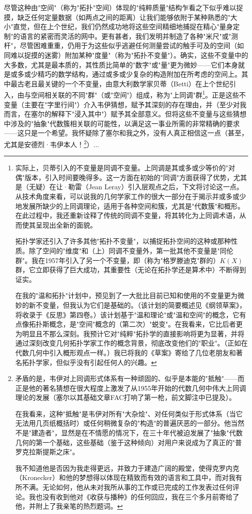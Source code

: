 尽管这种由"空间"（称为"拓扑"空间）体现的"纯粹质量"结构乍看之下似乎难以捉摸，缺乏任何定量数据（如两点之间的距离）让我们能够依附于某种熟悉的"大小"直觉，但在上个世纪，我们仍然成功地将这些空间精细地捕捉在精心"量身定制"的语言的紧密而灵活的网中。更有甚者，我们发明并制造了各种"米尺"或"测杆"，尽管困难重重，仍用于为这些似乎逃避任何测量尝试的触手可及的空间（如同难以捉摸的迷雾）附加某种"度量"（称为"拓扑不变量"）。确实，这些不变量中的大多数，尤其是最本质的，其性质比简单的"数字"或"量"更为微妙——它们本身就是或多或少精巧的数学结构，通过或多或少复杂的构造附加在所考虑的空间上。其中最古老且最关键的一个不变量，由意大利数学家贝蒂（Betti）在上个世纪引入，由与空间相关联的不同"群"（或"空间"）组成，称为"上同调"群\footnote{实际上，贝蒂引入的不变量是同调不变量。上同调是其或多或少等价的"对偶"版本，引入时间要晚得多。这一方面在初始的"同调"方面获得了优势，尤其是（无疑）在让·勒雷（Jean Leray）引入层观点之后，下文将讨论这一点。从技术角度来看，可以说我的几何学家工作的很大一部分在于揭示并或多或少地发展所缺少的上同调理论，适用于各种空间和簇，尤其是"代数簇"和概形。在此过程中，我还重新诠释了传统的同调不变量，将其转化为上同调术语，从而使其呈现出全新的面貌。

拓扑学家还引入了许多其他"拓扑不变量"，以捕捉拓扑空间的这种或那种性质。除了空间的"维度"和（上）同调不变量外，第一批其他不变量是"同伦群"。我在1957年引入了另一个不变量，即（称为"格罗滕迪克"群的）$K(X)$群，它立即获得了巨大成功，其重要性（无论在拓扑学还是算术中）不断得到证实。

在我的"温和拓扑"计划中，预见到了一大批比目前已知和使用的不变量更为微妙的新不变量，但我认为它们是基础的。（该计划的简要概述见《纲领草案》，将收录于《反思》第四卷。）该计划基于"温和理论"或"温和空间"的概念，它有点像拓扑斯概念，是"空间"概念的（第二次）"蜕变"。在我看来，它比后者更为明显且不那么深刻。我预计它对"纯粹"拓扑学的直接影响将更为显著，并将通过深刻改变几何拓扑学家工作的概念背景，彻底改变他们的"职业"。（正如在代数几何中引入概形观点一样。）我已将我的《草案》寄给了几位老朋友和著名拓扑学家，但似乎没有引起任何人的兴趣。}。正是这些不变量（主要在"字里行间"）介入韦伊猜想，赋予其深刻的存在理由，并（至少对我而言，在塞尔的解释下"浸入其中"）赋予其全部意义。但将这些不变量与这些猜想中涉及的"抽象"代数簇相关联的可能性，以满足这一事业所需的非常精确的要求——这只是一个希望。我怀疑除了塞尔和我之外，没有人真正相信这一点（甚至，尤其是安德烈·韦伊本人！\footnote{矛盾的是，韦伊对上同调形式体系有一种顽固的、似乎是本能的"抵触"——而正是他的著名猜想在很大程度上激发了从1955年开始的代数几何中伟大上同调理论的发展（塞尔以其基础文章FAC打响了第一枪，前文脚注中已提及）。

在我看来，这种"抵触"是韦伊对所有"大杂烩"、对任何类似于形式体系（当它无法用几页纸概括时）或任何稍微复杂的"构造"的普遍厌恶的一部分。他当然不是"建造者"，显然是在不情愿的情况下，在三十年代被迫发展了"抽象"代数几何的第一个基础，这些基础（鉴于这种倾向）对用户来说成为了真正的"普罗克拉斯提斯之床"。

我不知道他是否因为我走得更远，并致力于建造广阔的殿堂，使得克罗内克（Kronecker）和他的梦想得以体现在精致而有效的语言和工具中，而对我有所不满。无论如何，他从未对我所从事的工作或已完成的工作发表过任何评论。我也没有收到他对《收获与播种》的任何回应，我在三个多月前寄给了他，并附上了我亲笔的热烈题词。}）...

